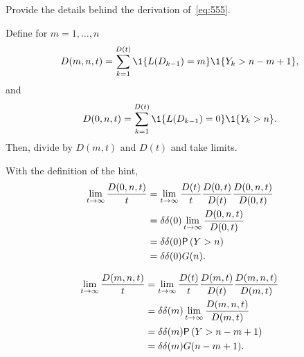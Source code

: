 \begin{exercise}
 Provide the details behind the derivation of~\cref{eq:555}.
\begin{hint}
Define for $m=1,\ldots, n$
\begin{equation*}
 D(m, n, t) = \sum_{k=1}^{D(t)}\1{L(D_{k-1})=m}\1{Y_k>n-m+1},
\end{equation*}
and 
\begin{equation*}
 D(0, n, t) = \sum_{k=1}^{D(t)}\1{L(D_{k-1})=0}\1{Y_k>n}.
\end{equation*}
Then, divide by $D(m,t)$ and $D(t)$ and take limits.
\end{hint}
\begin{solution}
With the definition of the hint, 
\begin{align*}
 \lim_{t\to\infty} \frac{ D(0, n, t)}t 
&= \lim_{t\to\infty} \frac{D(t)}t \frac{D(0, t)}{D(t)}\frac{ D(0, n, t)}{D(0,t)} \\
&= \delta \delta(0) \lim_{t\to\infty} \frac{ D(0, n, t)}{D(0,t)} \\
&= \delta \delta(0) \P{Y>n}\\
& = \delta \delta(0) G(n).
\end{align*}

\begin{align*}
 \lim_{t\to\infty} \frac{ D(m, n, t)}t 
&= \lim_{t\to\infty} \frac{D(t)}t \frac{D(m, t)}{D(t)}\frac{ D(m, n, t)}{D(m,t)} \\
&= \delta \delta(m) \lim_{t\to\infty} \frac{ D(m, n, t)}{D(m,t)} \\
&= \delta \delta(m) \P{Y>n-m+1}\\
& = \delta \delta(m) G(n-m+1).
\end{align*}
\end{solution}
\end{exercise}



